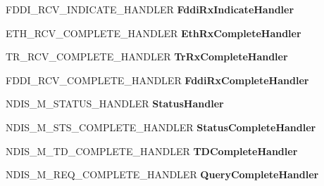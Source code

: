\begin{DoxyCompactItemize}
F\+D\+D\+I\+\_\+\+R\+C\+V\+\_\+\+I\+N\+D\+I\+C\+A\+T\+E\+\_\+\+H\+A\+N\+D\+L\+ER {\bfseries Fddi\+Rx\+Indicate\+Handler}
\item 
\mbox{\label{struct___n_d_i_s___m_i_n_i_p_o_r_t___b_l_o_c_k_a2631ca0286b8449c3d0372977c87ff07}} 
E\+T\+H\+\_\+\+R\+C\+V\+\_\+\+C\+O\+M\+P\+L\+E\+T\+E\+\_\+\+H\+A\+N\+D\+L\+ER {\bfseries Eth\+Rx\+Complete\+Handler}
\item 
\mbox{\label{struct___n_d_i_s___m_i_n_i_p_o_r_t___b_l_o_c_k_a7a4c03f035a23a67a2351e8e69ea3633}} 
T\+R\+\_\+\+R\+C\+V\+\_\+\+C\+O\+M\+P\+L\+E\+T\+E\+\_\+\+H\+A\+N\+D\+L\+ER {\bfseries Tr\+Rx\+Complete\+Handler}
\item 
\mbox{\label{struct___n_d_i_s___m_i_n_i_p_o_r_t___b_l_o_c_k_a57e2858a224706eb3083ae3a3519ce04}} 
F\+D\+D\+I\+\_\+\+R\+C\+V\+\_\+\+C\+O\+M\+P\+L\+E\+T\+E\+\_\+\+H\+A\+N\+D\+L\+ER {\bfseries Fddi\+Rx\+Complete\+Handler}
\item 
\mbox{\label{struct___n_d_i_s___m_i_n_i_p_o_r_t___b_l_o_c_k_a45d0e4406c82b7e4a8f7b4187b44cba5}} 
N\+D\+I\+S\+\_\+\+M\+\_\+\+S\+T\+A\+T\+U\+S\+\_\+\+H\+A\+N\+D\+L\+ER {\bfseries Status\+Handler}
\item 
\mbox{\label{struct___n_d_i_s___m_i_n_i_p_o_r_t___b_l_o_c_k_acd6b949097b1694a84d1ef0c67ddafae}} 
N\+D\+I\+S\+\_\+\+M\+\_\+\+S\+T\+S\+\_\+\+C\+O\+M\+P\+L\+E\+T\+E\+\_\+\+H\+A\+N\+D\+L\+ER {\bfseries Status\+Complete\+Handler}
\item 
\mbox{\label{struct___n_d_i_s___m_i_n_i_p_o_r_t___b_l_o_c_k_a878747467151ad3ec4fa15d06120fc6a}} 
N\+D\+I\+S\+\_\+\+M\+\_\+\+T\+D\+\_\+\+C\+O\+M\+P\+L\+E\+T\+E\+\_\+\+H\+A\+N\+D\+L\+ER {\bfseries T\+D\+Complete\+Handler}
\item 
\mbox{\label{struct___n_d_i_s___m_i_n_i_p_o_r_t___b_l_o_c_k_afa01e792e92dc3bff9cc3ad41542cc6b}} 
N\+D\+I\+S\+\_\+\+M\+\_\+\+R\+E\+Q\+\_\+\+C\+O\+M\+P\+L\+E\+T\+E\+\_\+\+H\+A\+N\+D\+L\+ER {\bfseries Query\+Complete\+Handler}

\end{DoxyCompactItemize}
